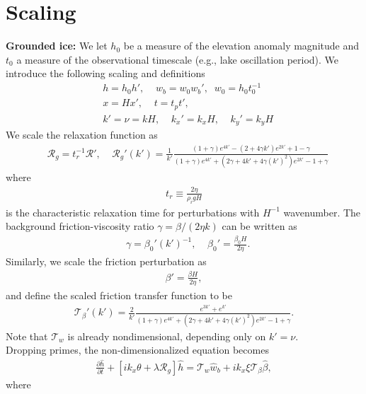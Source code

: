 \documentclass[paper=a4, fontsize=11pt]{article}
\begin{document}
\section*{Scaling}
\textbf{Grounded ice:}
We let $h_0$ be a measure of the elevation anomaly magnitude and
$t_0$ a measure of the observational timescale (e.g., lake oscillation period).
We introduce the following scaling and definitions
\begin{align}
& h = h_0 h', \;\;\;\; w_b = w_0 w_{b}' , \;\; w_0 = h_0 t_0^{-1} \\
&  x = Hx', \;\;\;\;
t = t_p t', \;\;\;\;\\
& k' = \nu = kH , \;\;\;\; k_x' = k_x H,\;\;\;\; k_y' = k_y H
\end{align}
We scale the relaxation function as
\begin{align}
   &\mathcal{R}_g = t_r^{-1} \mathcal{R}', \;\;\;\;
 \mathcal{R}_g'(k') =  \frac{1}{k'}\frac{ (1+\gamma)e^{4k'} -(2+4\gamma k')e^{2 k'} +1-\gamma  }{ (1+\gamma)e^{4 k'} + (2\gamma+4 k'+4\gamma (k')^2)e^{2 k'} -1 + \gamma  }
\end{align}
where
\begin{align}
t_r \equiv \frac{2\eta}{\rho_i g H}
\end{align}
is the characteristic relaxation time for perturbations with $H^{-1}$ wavenumber.
The background friction-viscosity ratio $\gamma=\beta/(2\eta k)$ can be written as
\begin{align}
   &\gamma = \beta_0' (k')^{-1}, \;\;\;\; \beta_0' = \frac{\beta_0 H}{2\eta}.
\end{align}
Similarly, we scale the friction perturbation as
\begin{align}
\beta' = \frac{ \beta H}{2\eta},
\end{align}
and define the scaled friction transfer function to be
\begin{align}
\mathcal{T}_{\beta}'(k') =  \frac{2}{k'}\frac{e^{3k'} + e^{k'}}{ (1+\gamma)e^{4 k'} + (2\gamma+4 k'+4\gamma (k')^2)e^{2 k'} -1 + \gamma  }.
\end{align}
Note that $\mathcal{T}_w$ is already nondimensional, depending only on $k' = \nu$.
\\
Dropping primes, the non-dimensionalized equation becomes
\begin{align}
\frac{\partial \widehat{h}}{\partial t} +\left[ik_x \theta + \lambda\mathcal{R}_g \right]\widehat{h} = \mathcal{T}_w\widehat{w}_b +   {ik_x\xi}\mathcal{T}_{\beta}\widehat{\beta}, \label{dhhatsc}
\end{align}
where
\end{document}
